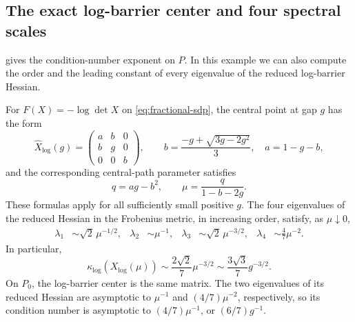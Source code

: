 \subsection{The exact log-barrier center and four spectral scales}

 gives the condition-number exponent on $P$.
In this example we can also compute the order and the leading constant
of every eigenvalue of the reduced log-barrier Hessian.

\begin{theorem}
\label{thm:fractional-spectrum}
For $F(X)=-\log\det X$ on \eqref{eq:fractional-sdp}, the central
point at gap $g$ has the form
\begin{equation}
 \widehat X_{\log}(g)=
 \begin{pmatrix}a&b&0\\b&g&0\\0&0&b\end{pmatrix},\qquad
 b=\frac{-g+\sqrt{3g-2g^2}}{3},\quad a=1-g-b,
 \label{eq:fractional-exact-center}
\end{equation}
and the corresponding central-path parameter satisfies
\begin{equation}
 q=ag-b^2,\qquad
 \mu=\frac{q}{1-b-2g}.
 \label{eq:fractional-gap-mu}
\end{equation}
These formulas apply for all sufficiently small positive $g$.
The four eigenvalues of the reduced Hessian in the Frobenius metric,
in increasing order, satisfy, as $\mu\downarrow0$,
\begin{align}
 \lambda_1&\sim\sqrt2\,\mu^{-1/2},&
 \lambda_2&\sim\mu^{-1},&
 \lambda_3&\sim\sqrt2\,\mu^{-3/2},&
 \lambda_4&\sim\frac47\mu^{-2}.
 \label{eq:four-eigenvalues}
\end{align}
In particular,
\begin{equation}
 \kappa_{\log}(X_{\log}(\mu))
 \sim\frac{2\sqrt2}{7}\mu^{-3/2}
 \sim\frac{3\sqrt3}{7}g^{-3/2}.
 \label{eq:fractional-condition-constant}
\end{equation}
On $P_0$, the log-barrier center is the same matrix. The two
eigenvalues of its reduced Hessian are asymptotic to
$\mu^{-1}$ and $(4/7)\mu^{-2}$, respectively, so its condition
number is asymptotic to $(4/7)\mu^{-1}$, or $(6/7)g^{-1}$.
\end{theorem}


